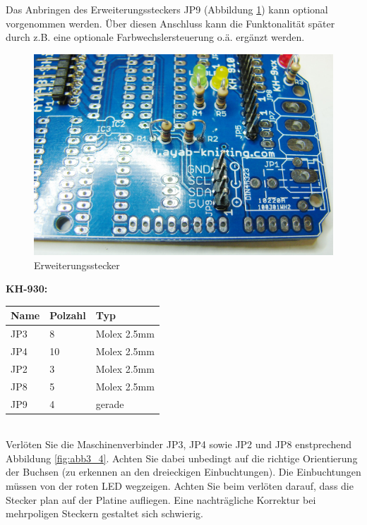 \documentclass[fleqn,10pt]{SelfArx} %
\begin{document}
Das Anbringen des Erweiterungssteckers JP9 (Abbildung \ref{fig:abb3_3}) kann optional vorgenommen werden. Über diesen Anschluss kann die Funktonalität später durch z.B. eine optionale Farbwechslersteuerung o.ä. ergänzt werden. \par

\begin{figure}[tbhp]\centering
\includegraphics[width=\linewidth]{abb3_3}
\caption{Erweiterungsstecker}
\label{fig:abb3_3}
\end{figure}

\FloatBarrier

\textbf{KH-930:} \\

\begin{tabular}{lll}
\hline
\textbf{Name} & \textbf{Polzahl}  & \textbf{Typ} \\ \hline
JP3           & 8                 & Molex 2.5mm  \\ \hline
JP4           & 10                & Molex 2.5mm  \\ \hline
JP2           & 3                 & Molex 2.5mm  \\ \hline
JP8           & 5                 & Molex 2.5mm  \\ \hline
JP9           & 4                 & gerade       \\ \hline
\end{tabular}\\

Verlöten Sie die Maschinenverbinder JP3, JP4 sowie JP2 und JP8 enstprechend Abbildung \ref{fig:abb3_4}. Achten Sie dabei unbedingt auf die richtige Orientierung der Buchsen (zu erkennen an den dreieckigen Einbuchtungen). Die Einbuchtungen müssen von der roten LED wegzeigen. Achten Sie beim verlöten darauf, dass die Stecker plan auf der Platine aufliegen. Eine nachträgliche Korrektur bei mehrpoligen Steckern gestaltet sich schwierig.
\end{document}
